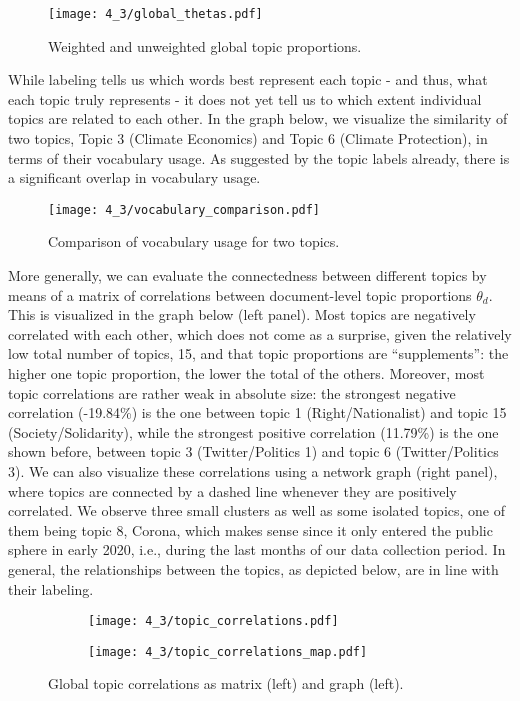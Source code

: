 \documentclass[12pt]{article}
\begin{document}
\begin{figure}[h!]
  \centering
  \captionsetup{justification=centering,margin=2cm}
  \texttt{[image: 4\_3/global\_thetas.pdf]}
  \caption{Weighted and unweighted global topic proportions.}
  \label{fig:global_thetas}
\end{figure}

While labeling tells us which words best represent each topic - and thus, what each topic truly represents - it does not yet tell us to which extent individual topics are related to each other. In the graph below, we visualize the similarity of two topics, Topic 3 (Climate Economics) and Topic 6 (Climate Protection), in terms of their vocabulary usage. As suggested by the topic labels already, there is a significant overlap in vocabulary usage.

\begin{figure}[h!]
  \centering
  \captionsetup{justification=centering,margin=2cm}
  \texttt{[image: 4\_3/vocabulary\_comparison.pdf]}
  \caption{Comparison of vocabulary usage for two topics.}
  \label{fig:vocabulary_comparison}
\end{figure}

More generally, we can evaluate the connectedness between different topics by means of a matrix of correlations between document-level topic proportions $\theta_d$. This is visualized in the graph below (left panel). Most topics are negatively correlated with each other, which does not come as a surprise, given the relatively low total number of topics, 15, and that topic proportions are “supplements”: the higher one topic proportion, the lower the total of the others. Moreover, most topic correlations are rather weak in absolute size: the strongest negative correlation (-19.84\%) is the one between topic 1 (Right/Nationalist) and topic 15 (Society/Solidarity), while the strongest positive correlation (11.79\%) is the one shown before, between topic 3 (Twitter/Politics 1) and topic 6 (Twitter/Politics 3). We can also visualize these correlations using a network graph (right panel), where topics are connected by a dashed line whenever they are positively correlated. We observe three small clusters as well as some isolated topics, one of them being topic 8, Corona, which makes sense since it only entered the public sphere in early 2020, i.e., during the last months of our data collection period. In general, the relationships between the topics, as depicted below, are in line with their labeling.

\begin{figure}[h!]
  \centering
  \captionsetup{justification=centering,margin=2cm}
  \begin{subfigure}[b]{0.4\linewidth}
    \texttt{[image: 4\_3/topic\_correlations.pdf]}
  \end{subfigure}
  \begin{subfigure}[b]{0.4\linewidth}
    \texttt{[image: 4\_3/topic\_correlations\_map.pdf]}
  \end{subfigure}
  \caption{Global topic correlations as matrix (left) and graph (left).}
  \label{fig:topic_correlations}
\end{figure}



\end{document}
